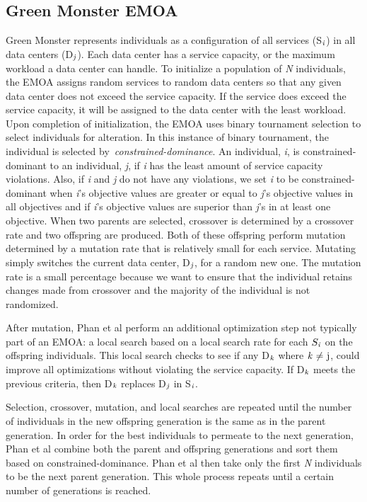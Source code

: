 \documentclass{sig-alternate}
\begin{document}
\subsection{Green Monster EMOA}
\label{sec:GMEMOA}

Green Monster represents individuals as a configuration of all services (S$_{\text{\emph{i}}}$) in all data centers (D$_{\text{\emph{j}}}$). Each data center has a service capacity, or the maximum workload a data center can handle. To initialize a population of \emph{N} individuals, the EMOA assigns random services to random data centers so that any given data center does not exceed the service capacity. If the service does exceed the service capacity, it will be assigned to the data center with the least workload. Upon completion of initialization, the EMOA uses binary tournament selection to select individuals for alteration. In this instance of binary tournament, the individual is selected by~\emph{constrained-dominance}. An individual, \emph{i}, is constrained-dominant to an individual, \emph{j}, if \emph{i} has the least amount of service capacity violations. Also, if \emph{i} and \emph{j} do not have any violations, we set \emph{i} to be constrained-dominant when \emph{i}'s objective values are greater or equal to \emph{j}'s objective values in all objectives and if \emph{i}'s objective values are superior than \emph{j}'s in at least one objective. When two parents are selected, crossover is determined by a crossover rate and two offspring are produced. Both of these offspring perform mutation determined by a mutation rate that is relatively small for each service. Mutating simply switches the current data center, D$_{\text{\emph{j}}}$, for a random new one. The mutation rate is a small percentage because we want to ensure that the individual retains changes made from crossover and the majority of the individual is not randomized. 

After mutation, Phan et al perform an additional optimization step not typically part of an EMOA: a local search based on a local search rate for each $S_{\text{\emph{i}}}$ on the offspring individuals. This local search checks to see if any D$_{\text{\emph{k}}}$ where ${\text{\emph{k} ${\neq}$ j}}$, could improve all optimizations without violating the service capacity. If D$_{\text{\emph{k}}}$ meets the previous criteria, then D$_{\text{\emph{k}}}$ replaces D$_{\text{\emph{j}}}$ in S$_{\text{\emph{i}}}$. 

Selection, crossover, mutation, and local searches are repeated until the number of individuals in the new offspring generation is the same as in the parent generation. In order for the best individuals to permeate to the next generation, Phan et al combine both the parent and offspring generations and sort them based on constrained-dominance. Phan et al then take only the first \emph{N} individuals to be the next parent generation. This whole process repeats until a certain number of generations is reached. 
\end{document}
